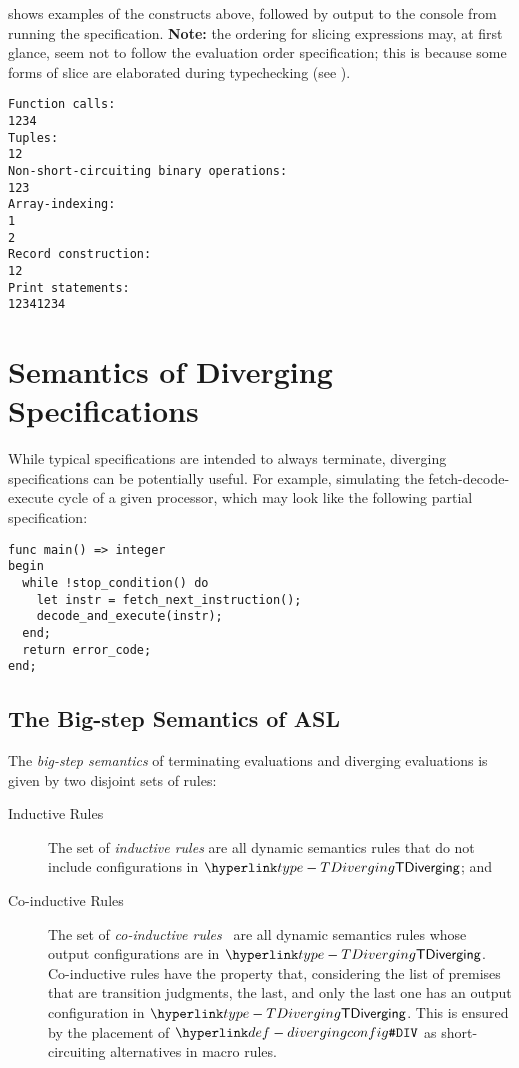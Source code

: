  shows examples of the constructs above, followed by output to the console from running the specification.
\textbf{Note:} the ordering for slicing expressions may, at first glance, seem not to follow the evaluation order specification; this is because some forms of slice are elaborated during typechecking (see ).
\begin{Verbatim}[fontsize=\footnotesize, frame=single]
Function calls:
1234
Tuples:
12
Non-short-circuiting binary operations:
123
Array-indexing:
1
2
Record construction:
12
Print statements:
12341234
\end{Verbatim}

\section{Semantics of Diverging Specifications\label{sec:Semantics of Diverging Specifications}}
While typical specifications are intended to always terminate,
diverging specifications can be potentially useful.
For example, simulating the fetch-decode-execute cycle of a given processor,
which may look like the following partial specification:
\begin{lstlisting}
func main() => integer
begin
  while !stop_condition() do
    let instr = fetch_next_instruction();
    decode_and_execute(instr);
  end;
  return error_code;
end;
\end{lstlisting}

\subsection{The Big-step Semantics of ASL}

\begin{definition}
The \emph{big-step semantics}\cite{SemanticsWithApplicationsBook} of terminating evaluations and diverging evaluations
is given by two disjoint sets of rules:
\begin{description}
  \item[Inductive Rules] The set of \emph{inductive rules} are all dynamic semantics
        rules that do not include configurations in $\TDiverging$; and
  \item[Co-inductive Rules] The set of \emph{co-inductive rules}~\cite{LeroyG:IC09}
       are all dynamic semantics rules whose output configurations are in $\TDiverging$.
       Co-inductive rules have the property that, considering the list of premises that
       are transition judgments, the last, and only the last one has an output configuration in $\TDiverging$.
       This is ensured by the placement of $\DivergingConfig$ as short-circuiting alternatives
       in macro rules.
\end{description}
\end{definition}

